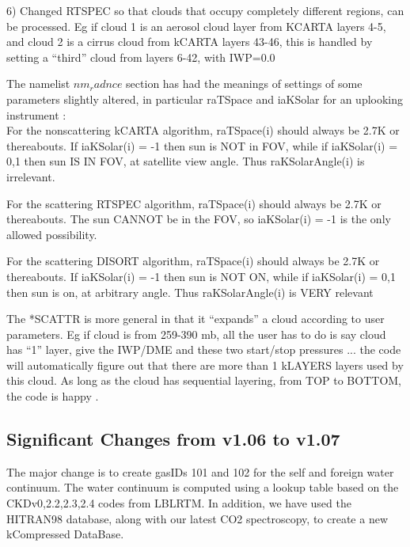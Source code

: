 \documentclass[12pt]{article}
\begin{document}
{{{{   6) Changed RTSPEC so that clouds that occupy completely 
      different regions, can be processed. Eg if cloud 1 is an
      aerosol cloud layer from KCARTA layers 4-5, and cloud 2 is a 
      cirrus cloud from kCARTA layers 43-46, this is handled by 
      setting a ``third'' cloud from layers 6-42, with IWP=0.0

The namelist $nm_radnce$ section has had the meanings of settings of some
parameters slightly altered, in particular raTSpace and iaKSolar for an
uplooking instrument : \\
For the nonscattering kCARTA algorithm, raTSpace(i) should always be 2.7K or 
thereabouts. If iaKSolar(i) = -1 then sun is NOT in FOV, while if iaKSolar(i) 
= 0,1 then sun IS IN FOV, at satellite view angle. Thus raKSolarAngle(i) is 
irrelevant.

For the scattering RTSPEC algorithm, raTSpace(i) should always be 2.7K or 
thereabouts. The sun CANNOT be in the FOV, so iaKSolar(i) = -1 is the only
allowed possibility. 

For the scattering DISORT algorithm, raTSpace(i) should always be 2.7K or 
thereabouts. If iaKSolar(i) = -1 then sun is NOT ON, while if iaKSolar(i) = 
0,1 then sun is on, at arbitrary angle. Thus raKSolarAngle(i) is VERY relevant

The *SCATTR is more general in that it ``expands'' a cloud according
to user parameters. Eg if cloud is from 259-390 mb, all the 
user has to do is say cloud has ``1'' layer, give the IWP/DME
and these two start/stop pressures ... the code will 
automatically figure out that there are more than 1 kLAYERS 
layers used by this cloud. As long as the cloud has sequential
layering, from TOP to BOTTOM, the code is happy .

\subsection{Significant Changes from v1.06 to v1.07}

The major change is to create gasIDs 101 and 102 for the self and foreign
water continuum. The water continuum is computed using a lookup table based
on the CKDv0,2.2,2.3,2.4 codes from LBLRTM. In addition, we have used the 
HITRAN98 database, along with our latest CO2 spectroscopy, to create a new
kCompressed DataBase.

}}}}
\end{document}
